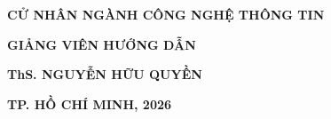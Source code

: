 \begin{titlepage}
    \vfill
    \begin{center}
        {\fontsize{15pt}{18pt}\selectfont \textbf{CỬ NHÂN NGÀNH CÔNG NGHỆ THÔNG TIN}\par}
    \end{center}

    \vfill
    \begin{center}
        {\fontsize{14pt}{18pt}\selectfont \textbf{GIẢNG VIÊN HƯỚNG DẪN}\par}
        \vspace{4pt}
        {\fontsize{14pt}{18pt}\selectfont \textbf{ThS. NGUYỄN HỮU QUYỀN}\par}
    \end{center}

    \vfill
    \begin{center}
        {\fontsize{13pt}{17pt}\selectfont \textbf{TP. HỒ CHÍ MINH, 2026}\par}
    \end{center}
\end{titlepage}
\restoregeometry
